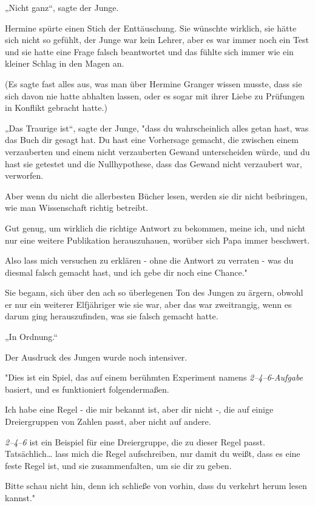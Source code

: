 {„Nicht ganz“, sagte der Junge.

Hermine spürte einen Stich der Enttäuschung. Sie wünschte wirklich, sie hätte sich nicht so gefühlt, der Junge war kein Lehrer, aber es war immer noch ein Test und sie hatte eine Frage falsch beantwortet und das fühlte sich immer wie ein kleiner Schlag in den Magen an.

(Es sagte fast alles aus, was man über Hermine Granger wissen musste, dass sie sich davon nie hatte abhalten lassen, oder es sogar mit ihrer Liebe zu Prüfungen in Konflikt gebracht hatte.)

„Das Traurige ist“, sagte der Junge, "dass du wahrscheinlich alles getan hast, was das Buch dir gesagt hat. Du hast eine Vorhersage gemacht, die zwischen einem verzauberten und einem nicht verzauberten Gewand unterscheiden würde, und du hast sie getestet und die Nullhypothese, dass das Gewand nicht verzaubert war, verworfen.

Aber wenn du nicht die allerbesten Bücher lesen, werden sie dir nicht beibringen, wie man Wissenschaft richtig betreibt.

Gut genug, um wirklich die richtige Antwort zu bekommen, meine ich, und nicht nur eine weitere Publikation herauszuhauen, worüber sich Papa immer beschwert.

Also lass mich versuchen zu erklären - ohne die Antwort zu verraten - was du diesmal falsch gemacht hast, und ich gebe dir noch eine Chance."

Sie begann, sich über den ach so überlegenen Ton des Jungen zu ärgern, obwohl er nur ein weiterer Elfjähriger wie sie war, aber das war zweitrangig, wenn es darum ging herauszufinden, was sie falsch gemacht hatte.

„In Ordnung.“

Der Ausdruck des Jungen wurde noch intensiver.

"Dies ist ein Spiel, das auf einem berühmten Experiment namens \emph{2–4–6-Aufgabe} basiert, und es funktioniert folgendermaßen.

Ich habe eine Regel - die mir bekannt ist, aber dir nicht -, die auf einige Dreiergruppen von Zahlen passt, aber nicht auf andere.

\emph{2–4–6} ist ein Beispiel für eine Dreiergruppe, die zu dieser Regel passt. Tatsächlich… lass mich die Regel aufschreiben, nur damit du weißt, dass es eine feste Regel ist, und sie zusammenfalten, um sie dir zu geben.

Bitte schau nicht hin, denn ich schließe von vorhin, dass du verkehrt herum lesen kannst."

}
